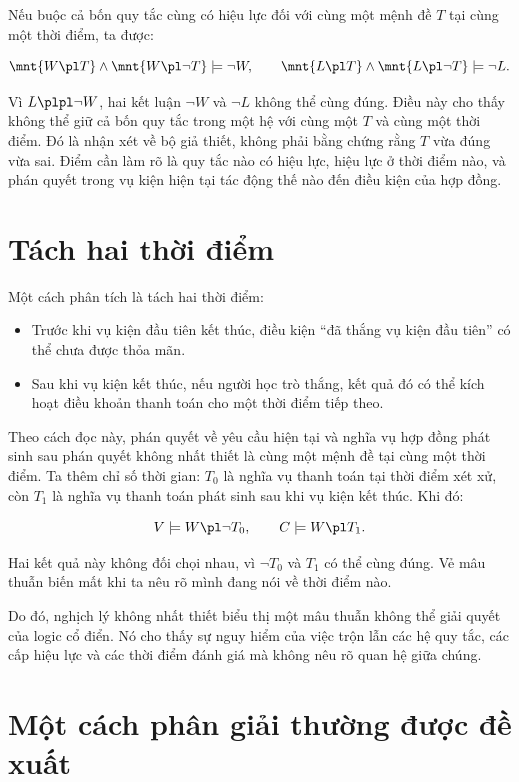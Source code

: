 Nếu buộc cả bốn quy tắc cùng có hiệu lực đối với cùng một mệnh đề $T$ tại cùng một thời điểm, ta được:

\[
\mnt{W \pl T} \wedge \mnt{W \pl \neg T} \models \neg W,
\qquad
\mnt{L \pl T} \wedge \mnt{L \pl \neg T} \models \neg L.
\]

Vì $L \plpl \neg W$, hai kết luận $\neg W$ và $\neg L$ không thể cùng đúng. Điều này cho thấy không thể giữ cả bốn quy tắc trong một hệ với cùng một $T$ và cùng một thời điểm. Đó là nhận xét về bộ giả thiết, không phải bằng chứng rằng $T$ vừa đúng vừa sai. Điểm cần làm rõ là quy tắc nào có hiệu lực, hiệu lực ở thời điểm nào, và phán quyết trong vụ kiện hiện tại tác động thế nào đến điều kiện của hợp đồng.

\section*{Tách hai thời điểm}

Một cách phân tích là tách hai thời điểm:

\begin{itemize}
    \item Trước khi vụ kiện đầu tiên kết thúc, điều kiện “đã thắng vụ kiện đầu tiên” có thể chưa được thỏa mãn.
    \item Sau khi vụ kiện kết thúc, nếu người học trò thắng, kết quả đó có thể kích hoạt điều khoản thanh toán cho một thời điểm tiếp theo.
\end{itemize}

Theo cách đọc này, phán quyết về yêu cầu hiện tại và nghĩa vụ hợp đồng phát sinh sau phán quyết không nhất thiết là cùng một mệnh đề tại cùng một thời điểm. Ta thêm chỉ số thời gian: $T_0$ là nghĩa vụ thanh toán tại thời điểm xét xử, còn $T_1$ là nghĩa vụ thanh toán phát sinh sau khi vụ kiện kết thúc. Khi đó:

\[
V \models W \pl \neg T_0,
\qquad
C \models W \pl T_1.
\]

Hai kết quả này không đối chọi nhau, vì $\neg T_0$ và $T_1$ có thể cùng đúng. Vẻ mâu thuẫn biến mất khi ta nêu rõ mình đang nói về thời điểm nào.

Do đó, nghịch lý không nhất thiết biểu thị một mâu thuẫn không thể giải quyết của logic cổ điển. Nó cho thấy sự nguy hiểm của việc trộn lẫn các hệ quy tắc, các cấp hiệu lực và các thời điểm đánh giá mà không nêu rõ quan hệ giữa chúng.

\section*{Một cách phân giải thường được đề xuất}

